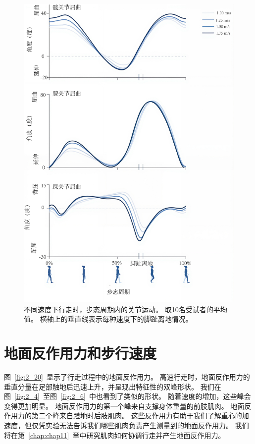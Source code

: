 \begin{figure}[!htb]
	\centering
	\includegraphics[width=0.9\linewidth]{chap2/2_19}
	\caption{不同速度下行走时，步态周期内的关节运动。
		取10名受试者的平均值。
		横轴上的垂直线表示每种速度下的脚趾离地情况\cite{arnold2013muscle}。 \label{fig:2_19}}
\end{figure}


\section{地面反作用力和步行速度}

图~\ref{fig:2_20}~显示了行走过程中的地面反作用力。
高速行走时，地面反作用力的垂直分量在足部触地后迅速上升，并呈现出特征性的双峰形状。
我们在图~\ref{fig:2_4}~至图~\ref{fig:2_6}~中也看到了类似的形状。
随着速度的增加，这些峰会变得更加明显。
地面反作用力的第一个峰来自支撑身体重量的前肢肌肉。
地面反作用力的第二个峰来自蹬地时后肢肌肉。
这些反作用力有助于我们了解重心的加速度，但仅凭实验无法告诉我们哪些肌肉负责产生测量到的地面反作用力。
我们将在第~\ref{chap:chap11}~章中研究肌肉如何协调行走并产生地面反作用力。


